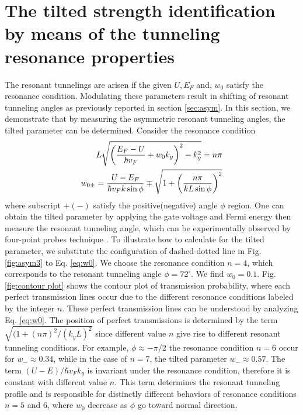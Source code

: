\section{The tilted strength identification by means of the tunneling resonance properties} \label{sec:find w}
    The resonant tunnelings are arisen if the given $U, E_F$ and, $w_0$ satisfy the resonance condition.
    Modulating these parameters result in shifting of resonant tunneling angles as previously reported in section \ref{sec:asym}.
    In this section, we demonstrate that by measuring the asymmetric resonant tunneling angles, the tilted parameter can be determined.
    Consider the resonance condition
    \begin{align} \label{eq:w0}
        L \sqrt{\left( \frac{E_F-U}{\hbar v_F}+ w_0 k_y \right)^2 -k_y^2} = n \pi \notag\\
        w_{0 \pm} = \frac{U-E_F}{\hbar v_F k \sin{\phi}}\mp \sqrt{1+\left(\frac{n \pi}{k L \sin{\phi}}\right)^2}
    \end{align}
    where subscript $+(-)$ satisfy the positive(negative) angle $\phi$ region.
    One can obtain the tilted parameter by applying the gate voltage and Fermi energy then measure the resonant tunneling angle, which can be experimentally observed
    by four-point probes technique \cite{Rahman2015}.
    To illustrate how to calculate for the tilted parameter, we substitute the configuration of dashed-dotted line in Fig. \ref{fig:asym3} to Eq. \ref{eq:w0}.
    We choose the resonance condition $n=4$, which corresponds to the resonant tunneling angle $\phi = 72^{\circ}$. We find $w_0 = 0.1$.
    Fig. \ref{fig:contour plot} shows the contour plot of transmission probability, where each perfect transmission lines occur due to the different resonance conditions labeled by the integer $n$. 
    These perfect transmission lines can be understood by analyzing Eq. \ref{eq:w0}. 
    The position of perfect transmissions is determined by the term $\sqrt{(1+(n \pi)^2/(k_y L)^2}$ since different value $n$ give rise to different resonant tunneling conditions. 
    For example, $\phi \approx -\pi/2$ the resonance condition $n=6$ occur for $w_{-} \approx 0.34$, while in the case of $n=7$, the tilted parameter $w_{-} \approx 0.57$. The term $(U-E)/\hbar v_F k_y$ is invariant under the resonance condition, therefore it is constant with different value $n$. 
    This term determines the resonant tunneling profile and is responsible for distinctly different behaviors of resonance conditions $n=5$ and 6, where $w_0$ decrease as $\phi$ go toward normal direction.\\
    
